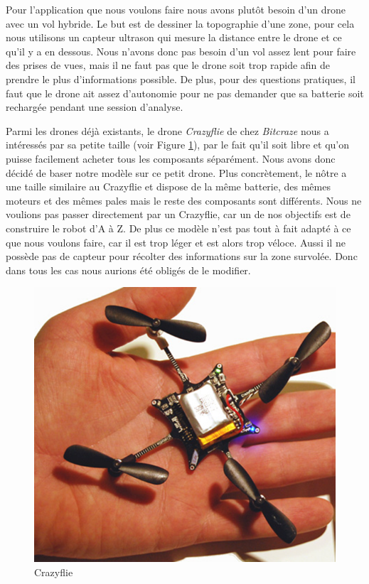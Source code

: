 \documentclass[a4paper,10pt]{report}
\begin{document}
    Pour l'application que nous voulons faire nous avons plutôt besoin d'un 
drone avec un vol hybride. Le but est de dessiner la topographie d'une zone, 
pour cela nous utilisons un capteur ultrason qui mesure la distance entre le 
drone et ce qu'il y a en dessous. Nous n'avons donc pas besoin d'un vol assez 
lent pour faire des prises de vues, mais il ne faut pas que le drone soit trop 
rapide afin de prendre le plus d'informations possible. De plus, pour des 
questions pratiques, il faut que le drone ait assez d'autonomie pour ne pas 
demander que sa batterie soit rechargée pendant une session d'analyse.
    
    Parmi les drones déjà existants, le drone \textit{Crazyflie} de chez 
\textit{Bitcraze}\cite{bitcraze} nous a intéressés par sa petite taille (voir 
Figure \ref{crazyflie}), par le fait qu'il soit libre et qu'on puisse facilement 
acheter tous les composants séparément. Nous avons donc décidé de baser notre 
modèle sur ce petit drone. Plus concrètement, le nôtre a une taille similaire 
au Crazyflie et dispose de la même batterie, des mêmes moteurs et des mêmes 
pales mais le reste des composants sont différents. Nous ne voulions pas passer 
directement par un Crazyflie, car un de nos objectifs est de construire le robot 
d'A à Z. De plus ce modèle n'est pas tout à fait adapté à ce que nous voulons 
faire, car il est trop léger et est alors trop véloce. Aussi il ne possède 
pas de capteur pour récolter des informations sur la zone survolée. Donc dans 
tous les cas nous aurions été obligés de le modifier.
    
    \begin{figure}[htbp]%
      \centering
      \includegraphics[scale = 0.25]{img/crazyflie.png}
      \caption{Crazyflie}
      \label{crazyflie}
    \end{figure}
    
\end{document}
